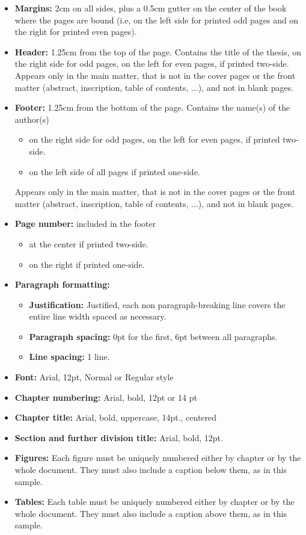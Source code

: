 \documentclass[en,inscr,ack,preface]{dimscthesis}
\begin{document}
\begin{itemize}
    \item \textbf{Margins:} 2cm on all sides, plus a 0.5cm gutter on the center of the book where the pages are bound (i.e, on the left side for printed odd pages and on the right for printed even pages).
    \item \textbf{Header:} 1.25cm from the top of the page.
    Contains the title of the thesis, on the right side for odd pages, on the left for even pages, if printed two-side.
    Appears only in the main matter, that is not in the cover pages or the front matter (abstract, inscription, table of contents, ...), and not in blank pages.
    \item \textbf{Footer:} 1.25cm from the bottom of the page.
    Contains the name(s) of the author(s)
    \begin{itemize}
        \item on the right side for odd pages, on the left for even pages, if printed two-side.
        \item on the left side of all pages if printed one-side.
    \end{itemize}
    Appears only in the main matter, that is not in the cover pages or the front matter (abstract, inscription, table of contents, ...), and not in blank pages.
    \item \textbf{Page number:} included in the footer
    \begin{itemize}
        \item at the center if printed two-side.
        \item on the right if printed one-side.
    \end{itemize}
    \item \textbf{Paragraph formatting:}
    \begin{itemize}
        \item \textbf{Justification:} Justified, each non paragraph-breaking line covers the entire line width spaced as necessary.
        \item \textbf{Paragraph spacing:} 0pt for the first, 6pt between all paragraphs.
        \item \textbf{Line spacing:} 1 line.
    \end{itemize}
    \item \textbf{Font:} Arial, 12pt, Normal or Regular style
    \item \textbf{Chapter numbering:} Arial, bold, 12pt or 14 pt
    \item \textbf{Chapter title:} Arial, bold, uppercase, 14pt., centered
    \item \textbf{Section and further division title:} Arial, bold, 12pt.
    \item \textbf{Figures:} Each figure must be uniquely numbered either by chapter or by the whole document.
    They must also include a caption below them, as in this sample.
    \item \textbf{Tables:} Each table must be uniquely numbered either by chapter or by the whole document.
    They must also include a caption above them, as in this sample.
\end{itemize}
\end{document}

